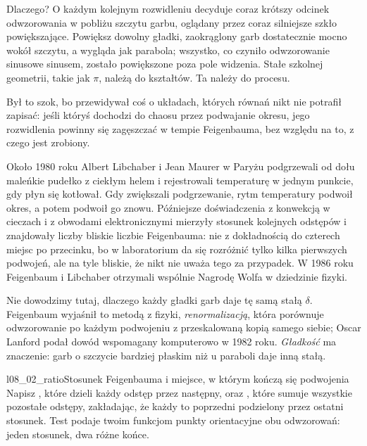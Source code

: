 \noindent
Dlaczego? O każdym kolejnym rozwidleniu decyduje coraz krótszy odcinek
odwzorowania w pobliżu szczytu garbu, oglądany przez coraz silniejsze szkło
powiększające. Powiększ dowolny gładki, zaokrąglony garb dostatecznie mocno
wokół szczytu, a wygląda jak parabola; wszystko, co czyniło odwzorowanie
sinusowe sinusem, zostało powiększone poza pole widzenia. Stałe szkolnej
geometrii, takie jak $\pi$, należą do kształtów. Ta należy do procesu.


\noindent
Był to szok, bo przewidywał coś o układach, których równań nikt nie potrafił
zapisać: jeśli któryś dochodzi do chaosu przez podwajanie okresu, jego
rozwidlenia powinny się zagęszczać w tempie Feigenbauma, bez względu na to, z
czego jest zrobiony.

\begin{worldbox}
Około 1980 roku Albert Libchaber i Jean Maurer w Paryżu podgrzewali od dołu
maleńkie pudełko z ciekłym helem i rejestrowali temperaturę w jednym
punkcie, gdy płyn się kotłował. Gdy zwiększali podgrzewanie, rytm temperatury
podwoił okres, a potem podwoił go znowu. Późniejsze doświadczenia z
konwekcją w cieczach i z obwodami elektronicznymi mierzyły stosunek
kolejnych odstępów i znajdowały liczby bliskie liczbie Feigenbauma: nie z
dokładnością do czterech miejsc po przecinku, bo w laboratorium da się
rozróżnić tylko kilka pierwszych podwojeń, ale na tyle bliskie, że nikt nie
uważa tego za przypadek. W 1986 roku Feigenbaum i Libchaber otrzymali
wspólnie Nagrodę Wolfa w dziedzinie fizyki.
\end{worldbox}

\begin{rigourbox}
Nie dowodzimy tutaj, dlaczego każdy gładki garb daje tę samą stałą
$\delta$. Feigenbaum wyjaśnił to metodą z fizyki, \emph{renormalizacją},
która porównuje odwzorowanie po każdym podwojeniu z przeskalowaną kopią
samego siebie; Oscar Lanford podał dowód wspomagany komputerowo w 1982 roku.
\emph{Gładkość} ma znaczenie: garb o szczycie bardziej płaskim niż u
paraboli daje inną stałą.
\end{rigourbox}

\begin{lab}{l08_02_ratio}{Stosunek Feigenbauma i miejsce, w którym kończą się podwojenia}
Napisz , które dzieli każdy odstęp przez następny, oraz
, które sumuje wszystkie pozostałe odstępy, zakładając,
że każdy to poprzedni podzielony przez ostatni stosunek. Test podaje twoim
funkcjom punkty orientacyjne obu odwzorowań: jeden stosunek, dwa różne
końce.
\end{lab}

